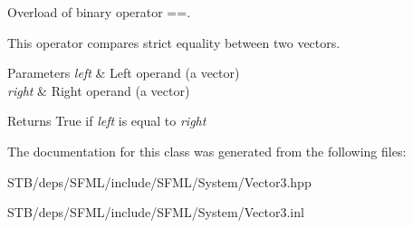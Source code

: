 Overload of binary operator ==. 

This operator compares strict equality between two vectors.


\begin{DoxyParams}{Parameters}
{\em left} & Left operand (a vector) \\
\hline
{\em right} & Right operand (a vector)\\
\hline
\end{DoxyParams}
\begin{DoxyReturn}{Returns}
True if {\itshape left} is equal to {\itshape right} 
\end{DoxyReturn}


The documentation for this class was generated from the following files\+:\begin{DoxyCompactItemize}
\item 
S\+T\+B/deps/\+S\+F\+M\+L/include/\+S\+F\+M\+L/\+System/Vector3.\+hpp\item 
S\+T\+B/deps/\+S\+F\+M\+L/include/\+S\+F\+M\+L/\+System/Vector3.\+inl\end{DoxyCompactItemize}
